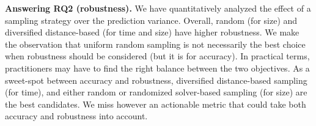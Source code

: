 
\textbf{Answering RQ2 (robustness).} We have quantitatively analyzed the effect of a sampling strategy over the prediction variance. 
Overall, random (for size) and diversified distance-based (for time and size) have higher robustness. 
We make the observation that uniform random sampling is not necessarily the best choice when robustness should be considered (but it is for accuracy). 
In practical terms, practitioners may have to find the right balance between the two objectives. As a sweet-spot between accuracy and robustness, diversified distance-based sampling (for time), and either random or randomized solver-based sampling (for size) are the best candidates. 
We miss however an actionable metric that could take both accuracy and robustness into account. 








